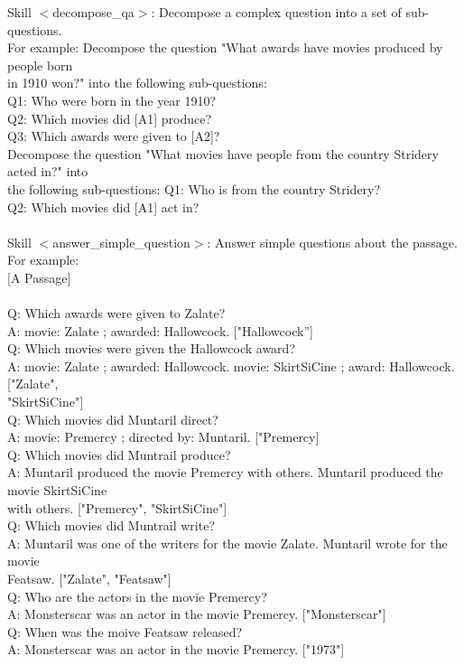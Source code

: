 \documentclass{article} %
\begin{document}
\newpage




\begin{tcolorbox}[title = {Skills for CommaQA-E task}, colback = Apricot!25!white, colframe = BrickRed!75!black] 
Skill $<$decompose\_qa$>$: Decompose a complex question into a set of sub-questions. \\ 
For example: Decompose the question "What awards have movies produced by people born \\ in 1910 won?"  
into the following sub-questions: \\
Q1: Who were born in the year 1910? \\
Q2: Which movies did [A1] produce? \\
Q3: Which awards were given to [A2]? \\
Decompose the question "What movies have people from the country Stridery acted in?" into  \\ 
the following sub-questions:
Q1: Who is from the country Stridery? \\
Q2: Which movies did [A1] act in? \\ \\

Skill $<$answer\_simple\_question$>$: Answer simple questions about the passage. \\
For example:  \\
$[$A Passage$]$ \\  \\
Q: Which awards were given to Zalate? \\
A: movie: Zalate ; awarded: Hallowcock. ["Hallowcock”] \\
Q: Which movies were given the Hallowcock award? \\
A: movie: Zalate ; awarded: Hallowcock. movie: SkirtSiCine ; award: Hallowcock. ["Zalate", \\ "SkirtSiCine"]  \\
Q: Which movies did Muntaril direct? \\
A: movie: Premercy ; directed by: Muntaril. ["Premercy] \\
Q: Which movies did Muntrail produce? \\
A: Muntaril produced the movie Premercy with others. Muntaril produced the movie SkirtSiCine  \\ 
with others. ["Premercy", "SkirtSiCine"] \\
Q: Which movies did Muntrail write? \\
A: Muntaril was one of the writers for the movie Zalate. Muntaril wrote for the movie \\
Featsaw. ["Zalate", "Featsaw"] \\
Q: Who are the actors in the movie Premercy? \\ 
A: Monsterscar was an actor in the movie Premercy. ["Monsterscar"] \\
Q: When was the moive Featsaw released? \\
A: Monsterscar was an actor in the movie Premercy. ["1973"] \\
\end{tcolorbox}
\end{document}
